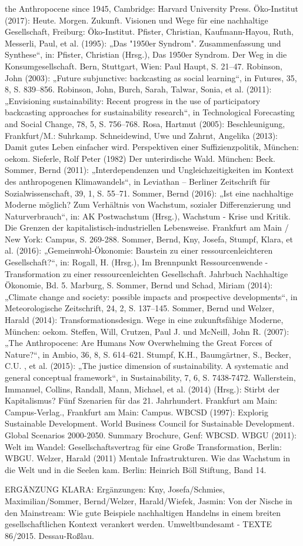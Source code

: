 the Anthropocene since 1945, Cambridge: Harvard University Press. Öko-Institut (2017): Heute. Morgen. Zukunft. Visionen und Wege für eine nachhaltige Gesellschaft, Freiburg: Öko-Institut. Pfister, Christian, Kaufmann-Hayou, Ruth, Messerli, Paul, et al. (1995): „Das "1950er Syndrom". Zusammenfassung und Synthese“, in: Pfister, Christian (Hrsg.), Das 1950er Syndrom. Der Weg in die Konsumgesellschaft. Bern, Stuttgart, Wien: Paul Haupt, S. 21–47. Robinson, John (2003): „Future subjunctive: backcasting as social learning“, in Futures, 35, 8, S. 839–856. Robinson, John, Burch, Sarah, Talwar, Sonia, et al. (2011): „Envisioning sustainability: Recent progress in the use of participatory backcasting approaches for sustainability research“, in Technological Forecasting and Social Change, 78, 5, S. 756–768. Rosa, Hartmut (2005): Beschleunigung, Frankfurt/M.: Suhrkamp. Schneidewind, Uwe und Zahrnt, Angelika (2013): Damit gutes Leben einfacher wird. Perspektiven einer Suffizienzpolitik, München: oekom. Sieferle, Rolf Peter (1982) Der unterirdische Wald. München: Beck. Sommer, Bernd (2011): „Interdependenzen und Ungleichzeitigkeiten im Kontext des anthropogenen Klimawandels“, in Leviathan – Berliner Zeitschrift für Sozialwissenschaft, 39, 1, S. 55–71. Sommer, Bernd (2016): „Ist eine nachhaltige Moderne möglich? Zum Verhältnis von Wachstum, sozialer Differenzierung und Naturverbrauch“, in: AK Postwachstum (Hrsg.), Wachstum - Krise und Kritik. Die Grenzen der kapitalistisch-industriellen Lebensweise. Frankfurt am Main / New York: Campus, S. 269-288. Sommer, Bernd, Kny, Josefa, Stumpf, Klara, et al. (2016): „Gemeinwohl-Ökonomie: Baustein zu einer ressourcenleichteren Gesellschaft?“, in: Rogall, H. (Hrsg.), Im Brennpunkt Ressourcenwende - Transformation zu einer ressourcenleichten Gesellschaft. Jahrbuch Nachhaltige Ökonomie, Bd. 5. Marburg, S. Sommer, Bernd und Schad, Miriam (2014): „Climate change and society: possible impacts and prospective developments“, in Meteorologische Zeitschrift, 24, 2, S. 137–145. Sommer, Bernd und Welzer, Harald (2014): Transformationsdesign. Wege in eine zukunftsfähige Moderne, München: oekom. Steffen, Will, Crutzen, Paul J. und McNeill, John R. (2007): „The Anthropocene: Are Humans Now Overwhelming the Great Forces of Nature?“, in Ambio, 36, 8, S. 614–621. Stumpf, K.H., Baumgärtner, S., Becker, C.U. , et al. (2015): „The justice dimension of sustainability. A systematic and general conceptual framework“, in Sustainability, 7, 6, S. 7438-7472. Wallerstein, Immanuel, Collins, Randall, Mann, Michael, et al. (2014) (Hrsg.): Stirbt der Kapitalismus? Fünf Szenarien für das 21. Jahrhundert. Frankfurt am Main: Campus-Verlag., Frankfurt am Main: Campus. WBCSD (1997): Explorig Sustainable Development. World Business Council for Sustainable Development. Global Scenarios 2000-2050. Summary Brochure, Genf: WBCSD. WBGU (2011): Welt im Wandel: Gesellschaftsvertrag für eine Große Transformation, Berlin: WBGU. Welzer, Harald (2011) Mentale Infrastrukturen. Wie das Wachstum in die Welt und in die Seelen kam. Berlin: Heinrich Böll Stiftung, Band 14.


ERGÄNZUNG KLARA:
Ergänzungen: Kny, Josefa/Schmies, Maximilian/Sommer, Bernd/Welzer, Harald/Wiefek, Jasmin: Von der Nische in den Mainstream: Wie gute Beispiele nachhaltigen Handelns in einem breiten gesellschaftlichen Kontext verankert werden. Umweltbundesamt - TEXTE 86/2015. Dessau-Roßlau.